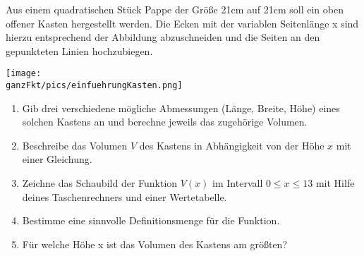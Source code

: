\begin{minipage}{0.66\textwidth}
	Aus einem quadratischen Stück Pappe der Größe  21cm auf 21cm soll ein oben offener Kasten hergestellt werden. Die Ecken mit der variablen Seitenlänge x sind hierzu entsprechend der Abbildung abzuschneiden und die Seiten an den gepunkteten Linien hochzubiegen.
\end{minipage}
\begin{minipage}{0.33\textwidth}
	\texttt{[image: \\ganzFkt/pics/einfuehrungKasten.png]}
\end{minipage}

\bigskip

\begin{enumerate}[label=\alph*)]
	\item Gib drei verschiedene mögliche Abmessungen (Länge, Breite, Höhe) eines solchen Kastens an und berechne jeweils das zugehörige Volumen.
	\item Beschreibe das Volumen \(V\) des Kastens in Abhängigkeit von der Höhe \(x\) mit einer Gleichung.
	\item Zeichne das Schaubild der Funktion \(V(x)\) im Intervall \(0 \leq x \leq 13\) mit Hilfe deines Taschenrechners und einer Wertetabelle.
	\item Bestimme eine sinnvolle Definitionsmenge für die Funktion.
	\item Für welche Höhe x ist das Volumen des Kastens am größten?
\end{enumerate}

\bigskip

